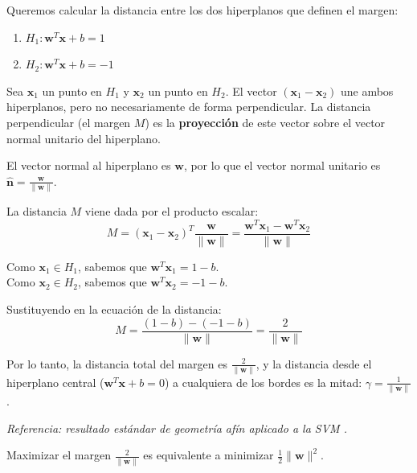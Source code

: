 \documentclass[12pt, a4paper]{article}
\begin{document}
\begin{tcolorbox}[colback=gray!5!white,colframe=gray!75!black,title=\textbf{Demostración: Cálculo del margen geométrico}]
Queremos calcular la distancia entre los dos hiperplanos que definen el margen:
\begin{enumerate}
    \item $H_1: \mathbf{w}^T \mathbf{x} + b = 1$
    \item $H_2: \mathbf{w}^T \mathbf{x} + b = -1$
\end{enumerate}

Sea $\mathbf{x}_1$ un punto en $H_1$ y $\mathbf{x}_2$ un punto en $H_2$. El vector $(\mathbf{x}_1 - \mathbf{x}_2)$ une ambos hiperplanos, pero no necesariamente de forma perpendicular. La distancia perpendicular (el margen $M$) es la \textbf{proyección} de este vector sobre el vector normal unitario del hiperplano.

El vector normal al hiperplano es $\mathbf{w}$, por lo que el vector normal unitario es $\hat{\mathbf{n}} = \frac{\mathbf{w}}{\|\mathbf{w}\|}$.

La distancia $M$ viene dada por el producto escalar:
\[ M = (\mathbf{x}_1 - \mathbf{x}_2)^T \frac{\mathbf{w}}{\|\mathbf{w}\|} = \frac{\mathbf{w}^T \mathbf{x}_1 - \mathbf{w}^T \mathbf{x}_2}{\|\mathbf{w}\|} \]

Como $\mathbf{x}_1 \in H_1$, sabemos que $\mathbf{w}^T \mathbf{x}_1 = 1 - b$. \\
Como $\mathbf{x}_2 \in H_2$, sabemos que $\mathbf{w}^T \mathbf{x}_2 = -1 - b$.

Sustituyendo en la ecuación de la distancia:
\[ M = \frac{(1 - b) - (-1 - b)}{\|\mathbf{w}\|} = \frac{2}{\|\mathbf{w}\|} \]

Por lo tanto, la distancia total del margen es $\frac{2}{\|\mathbf{w}\|}$, y la distancia desde el hiperplano central ($\mathbf{w}^T \mathbf{x} + b = 0$) a cualquiera de los bordes es la mitad: $\gamma = \frac{1}{\|\mathbf{w}\|}$.

\textit{Referencia: resultado estándar de geometría afín aplicado a la SVM \cite{hastie2009elements, bishop2006pattern}.}
\end{tcolorbox}

\noindent Maximizar el margen $\frac{2}{\|\mathbf{w}\|}$ es equivalente a minimizar $\frac{1}{2}\|\mathbf{w}\|^2$.
\end{document}
